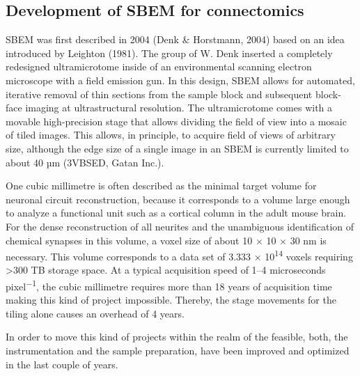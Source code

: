 \documentclass{article}
\begin{document}
\subsection*{Development of SBEM for connectomics}

SBEM was first described in 2004 (Denk \& Horstmann, 2004) based on an idea introduced by Leighton (1981). The group of W. Denk inserted a completely redesigned ultramicrotome inside of an environmental scanning electron microscope with a field emission gun. In this design, SBEM allows for automated, iterative removal of thin sections from the sample block and subsequent block-face imaging at ultrastructural resolution. The ultramicrotome comes with a movable high-precision stage that allows dividing the field of view into a mosaic of tiled images. This allows, in principle, to acquire field of views of arbitrary size, although the edge size of a single image in an SBEM is currently limited to about 40 µm (3VBSED, Gatan Inc.).

One cubic millimetre is often described as the minimal target volume for neuronal circuit reconstruction, because it corresponds to a volume large enough to analyze a functional unit such as a cortical column in the adult mouse brain. For the dense reconstruction of all neurites and the unambiguous identification of chemical synapses in this volume, a voxel size of about 10 × 10 × 30 nm is necessary. This volume corresponds to a data set of 3.333 × 10\textsuperscript{14} voxels requiring >300 TB storage space. At a typical acquisition speed of 1–4 microseconds pixel\textsuperscript{−1}, the cubic millimetre requires more than 18 years of acquisition time making this kind of project impossible. Thereby, the stage movements for the tiling alone causes an overhead of 4 years.

In order to move this kind of projects within the realm of the feasible, both, the instrumentation and the sample preparation, have been improved and optimized in the last couple of years.
\end{document}
